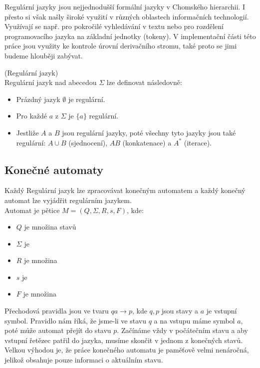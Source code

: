 Regulární jazyky jsou nejjednodušší formální jazyky v Chomského hierarchii.
I přesto si však našly široké využití v různých oblastech informačních technologií.
Využívají se např. pro pokročilé vyhledávání v textu nebo
pro rozdělení programovacího jazyka na základní jednotky (tokeny).
V implementační části této práce jsou využity ke kontrole úrovní derivačního stromu,
také proto se jimi budeme hlouběji zabývat.

\begin{defn}
  (Regulární jazyk)\\
  Regulární jazyk nad abecedou $\Sigma$ lze definovat následovně:
  \begin{itemize}
    \item Prázdný jazyk $\emptyset$ je regulární.
    \item Pro každé $a$ z $\Sigma$ je $\{ a \}$ regulární.
    \item Jestliže $A$ a $B$ jsou regulární jazyky, poté všechny tyto jazyky jsou také regulární:
    $A \cup B$ (sjednocení), $AB$ (konkatenace) a $A^*$ (iterace).
  \end{itemize}
\end{defn}

\subsection*{Konečné automaty}
Každý Regulární jazyk lze zpracovávat konečným automatem a každý konečný automat
lze vyjádřit regulárním jazykem.\\

Automat je pětice $M = (Q, \Sigma, R, s, F)$, kde:
\begin{itemize}
  \item $Q$ je množina stavů
  \item $\Sigma$ je 
  \item $R$ je množina 
  \item $s$ je 
  \item $F$ je množina 
\end{itemize}

Přechodová pravidla jsou ve tvaru $qa \rightarrow p$, kde $q, p$ jsou stavy a
$a$ je vstupní symbol. Pravidlo nám říká, že jsme-li ve stavu $q$ a na vstupu
máme symbol $a$, poté může automat přejít do stavu $p$.
Začínáme vždy v počátečním stavu a aby vstupní řetězec patřil do jazyka,
musíme skončit v jednom z konečných stavů.
Velkou výhodou je, že práce konečného automatu je paměťově velmi nenáročná, jelikož obsahuje pouze informaci o aktuálním
stavu.

